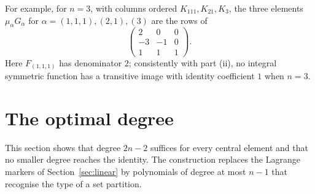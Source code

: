 \documentclass[11pt,a4paper]{article}
\theoremstyle{definition}
\begin{document}
For example, for $n=3$, with columns ordered $K_{111},K_{21},K_3$, the three elements $\mu_\alpha G_\alpha$ for $\alpha=(1,1,1),(2,1),(3)$ are the rows of
\[
 \begin{pmatrix}2&0&0\\-3&-1&0\\1&1&1\end{pmatrix}.
\]
Here $F_{(1,1,1)}$ has denominator $2$; consistently with part (ii), no integral symmetric function has a transitive image with identity coefficient $1$ when $n=3$.

\section{The optimal degree}\label{sec:degree}
This section shows that degree $2n-2$ suffices for every central element and that no smaller degree reaches the identity. The construction replaces the Lagrange markers of Section~\ref{sec:linear} by polynomials of degree at most $n-1$ that recognise the type of a set partition.
\end{document}
